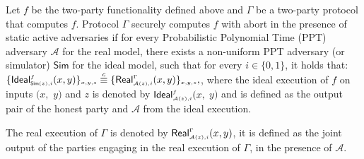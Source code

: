  \vspace{-2.5mm} 
  
  
\begin{definition}\label{def::MPC-active-adv}
Let $f$ be the two-party functionality defined above and $\Gamma$ be a two-party protocol that computes $f$.   Protocol $\Gamma$ securely computes $f$ with abort in the presence of static active adversaries if for every Probabilistic Polynomial Time (PPT) adversary $\mathcal{A}$ for the real model, there exists a non-uniform PPT adversary (or simulator) $\mathsf{Sim}$ for the ideal model, such that for every $i\in \{0,1\}$, it holds that: 
%
$
\{\mathsf {Ideal}^{\scriptscriptstyle f}_{\scriptscriptstyle \mathsf{Sim}(z), i}(x,y)\}_{\scriptscriptstyle x,y,z}\stackrel{c}{\equiv} \{\mathsf{Real}_{\scriptscriptstyle \mathcal{A}(z), i}^{\scriptscriptstyle \Gamma}(x,y) \}_{\scriptscriptstyle x,y,z},
$, 
%
 where the ideal execution of $f$ on inputs $(x,$ $ y)$ and $z$ is denoted by $\mathsf{Ideal}^{\scriptscriptstyle f}_{\scriptscriptstyle\mathcal{A}(z), i}(x,$ $y)$ and is defined as the output pair of the honest party and $\mathcal{A}$ from the ideal execution.   \end{definition}
 
 
 The real execution of $\Gamma$ is denoted by $\mathsf{Real}^{\scriptscriptstyle \Gamma}_{\scriptscriptstyle\mathcal{A}(z), i}(x,y)$, it is defined as the joint output of the parties engaging in the real execution of $\Gamma$, in the presence of $\mathcal{A}$.

  